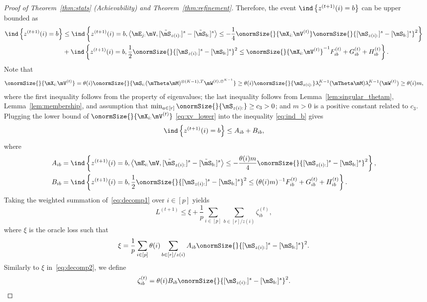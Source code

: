\documentclass[lettersize,onecolumn,journal]{IEEEtran}
\theoremstyle{definition}
\theoremstyle{definition}
\newcommand{\offf}[1]{\left\{#1\right\}}
\newcommand{\ang}[1]{\left\langle#1\right\rangle}
\begin{document}
\begin{proof}[Proof of Theorem~\ref{thm:stats} (Achievability) and Theorem~\ref{thm:refinement}]
   Therefore, the event $ \ind \offf{ z^{(t+1)}(i) = b }$ can be upper bounded as
    \begin{align}
         \ind \offf{ z^{(t+1)}(i) = b  }& \leq \ind \offf{ z^{(t+1)}(i) = b ,   \ang{ \mE_{j:} \mV, [  \tilde \mS_{z(i):} ]^s - [  \tilde \mS_{b:} ]^s }  \leq - \frac{1}{4} \onormSize{}{\mX_{i:} \mV^{(t)}} \onormSize{}{ [ \mS_{z(i):}  ]^s - [ \mS_{b:}  ]^s  }^2 } \\
         & + \ind \offf{z^{(t+1)}(i) = b, \frac{1}{2}\onormSize{}{ [ \mS_{z(i):}  ]^s - [ \mS_{b:}  ]^s  }^2 \leq \onormSize{}{\mX_{i:} \mV^{(t)}}^{-1} F_{ib}^{(t)} + G_{ib}^{(t)} + H_{ib}^{(t)} }. \label{eq:ind_b}
    \end{align}
   Note that 
    \begin{align}
     \onormSize{}{\mX_{i:} \mV^{(t)}}  = \theta(i) \onormSize{}{\mS_{i:} (\mTheta \mM)^{\otimes (K-1),T} \mW^{(t), \otimes^{K-1}}}
         \geq \theta(i) \onormSize{}{\mS_{z(i):}} \lambda_r^{K-1}(\mTheta \mM) \lambda^{K-1}_r(\mW^{(t)})
         \geq\theta(i) m , \label{eq:xv_lower}
    \end{align}
    where the first inequality follows from the property of eigenvalues; the last inequality follows from Lemma~\ref{lem:singular_thetam}, Lemma~\ref{lem:membership}, and assumption that $\min_{a \in [r]} \onormSize{}{\mS_{z(i):}} \geq c_3>0$; and $m >0$ is a positive constant related to $ c_3$. Plugging the lower bound of $ \onormSize{}{\mX_{i:} \mV^{(t)}}$ \eqref{eq:xv_lower} into the inequality \eqref{eq:ind_b} gives
    \begin{equation}\label{eq:decomp1}
        \ind \offf{ z^{(t+1)}(i) = b  } \leq A_{ib} + B_{ib},
    \end{equation}
    where 
    \begin{align}
        A_{ib} &= \ind \offf{z^{(t+1)}(i) = b, \ang{ \mE_{i:} \mV, [  \tilde \mS_{z(i):} ]^s - [  \tilde \mS_{b:} ]^s }  \leq - \frac{\theta(i) m}{4} \onormSize{}{ [ \mS_{z(i):}  ]^s - [ \mS_{b:}  ]^s  }^2 },\\
        B_{ib} &= \ind \offf{z^{(t+1)}(i) = b, \frac{1}{2}\onormSize{}{ [ \mS_{z(i):}  ]^s - [ \mS_{b:}  ]^s  }^2 \leq (\theta(i) m)^{-1} F_{ib}^{(t)} + G_{ib}^{(t)} + H_{ib}^{(t)} }.
    \end{align}
 Taking the weighted summation of~\eqref{eq:decomp1} over $i \in [p]$ yields 
    \begin{equation}
        L^{(t+1)} \leq \xi + \frac{1}{p}\sum_{i \in [p] }  \sum_{b \in [r]/z(i)}  \zeta_{ib}^{(t)}, 
    \end{equation}
    where $\xi$ is the oracle loss such that 
    \begin{equation}\label{eq:decomp2}
        \xi =   \frac{1}{p} \sum_{i \in [p] } \theta(i) \sum_{b \in [r]/z(i)} A_{ib} \onormSize{}{ [ \mS_{ z(i):}  ]^s - [ \mS_{b:}  ]^s  }^2.
    \end{equation}
    Similarly to $\xi$ in~\eqref{eq:decomp2}, we define
    \begin{equation}
        \zeta_{ib}^{(t)} =   \theta(i) B_{ib} \onormSize{}{ [ \mS_{ z(i):}  ]^s - [ \mS_{b:}  ]^s  }^2.
    \end{equation}
    

\end{proof}
\end{document}
